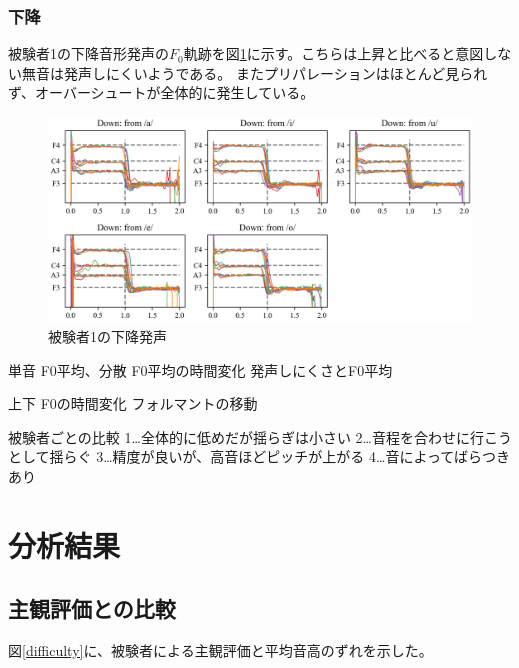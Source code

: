 \documentclass[10.5ptj,a4j,dvipdfmx,uplatex, oneside, openany, report, draft]{jsbook}%
\begin{document}
\subsection{下降}
被験者1の下降音形発声の$F_0$軌跡を図\ref{fig:d1}に示す。こちらは上昇と比べると意図しない無音は発声しにくいようである。
またプリパレーションはほとんど見られず、オーバーシュートが全体的に発生している。

\begin{figure}[htbp]
    \begin{center}
      \includegraphics[clip,width=16.0cm]{F0_down_1.png}
      \caption{被験者1の下降発声}
      \label{fig:d1}
    \end{center}
\end{figure}


単音
F0平均、分散
F0平均の時間変化
発声しにくさとF0平均

上下
F0の時間変化
フォルマントの移動


被験者ごとの比較
1…全体的に低めだが揺らぎは小さい
2…音程を合わせに行こうとして揺らぐ
3…精度が良いが、高音ほどピッチが上がる
4…音によってばらつきあり




\chapter{分析結果}

\section{主観評価との比較}
図\ref{difficulty}に、被験者による主観評価と平均音高のずれを示した。
\end{document}
